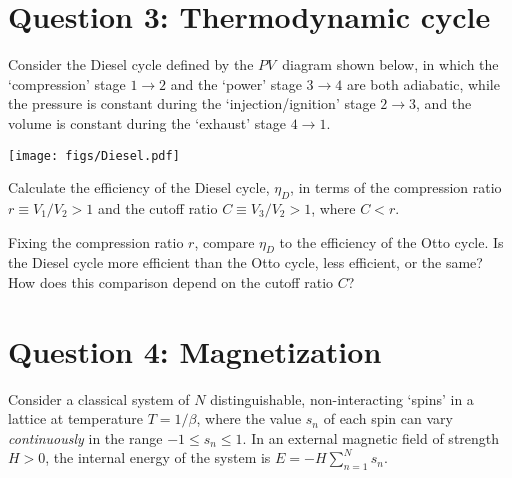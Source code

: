 \documentclass[12 pt]{article} %
\newcommand{\be}{\ensuremath{\beta} }
\newcommand{\showmarks}[1]{\rightline{\texttt{[#1 marks]}}} %
\begin{document}
\newpage
\section*{Question 3: Thermodynamic cycle}
Consider the Diesel cycle defined by the $PV$~diagram shown below, in which the `compression' stage $1 \to 2$ and the `power' stage $3 \to 4$ are both adiabatic, while the pressure is constant during the `injection/ignition' stage $2 \to 3$, and the volume is constant during the `exhaust' stage $4 \to 1$.

\begin{center}\texttt{[image: figs/Diesel.pdf]}\end{center}

Calculate the efficiency of the Diesel cycle, $\eta_D$, in terms of the compression ratio $r \equiv V_1 / V_2 > 1$ and the cutoff ratio $C \equiv V_3 / V_2 > 1$, where $C < r$.

\showmarks{20}

Fixing the compression ratio $r$, compare $\eta_D$ to the efficiency of the Otto cycle.
Is the Diesel cycle more efficient than the Otto cycle, less efficient, or the same?
How does this comparison depend on the cutoff ratio $C$?

\showmarks{8}



\newpage %
\section*{Question 4: Magnetization}
Consider a classical system of $N$ distinguishable, non-interacting `spins' in a lattice at temperature $T = 1 / \be$, where the value $s_n$ of each spin can vary \emph{continuously} in the range $-1 \leq s_n \leq 1$.
In an external magnetic field of strength $H > 0$, the internal energy of the system is $\displaystyle E = -H \sum_{n = 1}^N s_n$.
\end{document}
